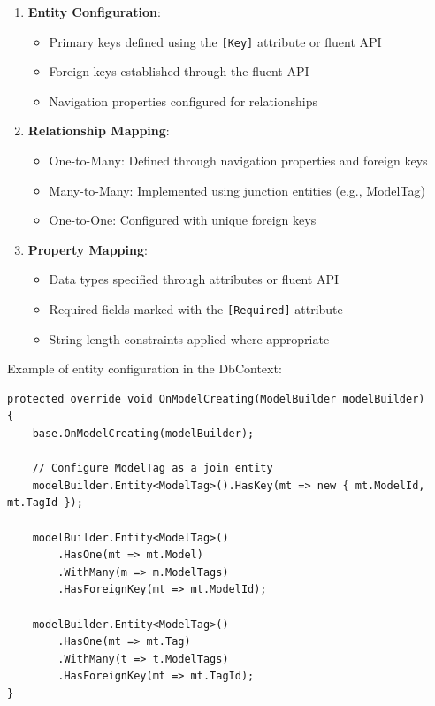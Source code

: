 \begin{enumerate}
   \item \textbf{Entity Configuration}:
   \begin{itemize}
      \item Primary keys defined using the \texttt{[Key]} attribute or fluent API
      \item Foreign keys established through the fluent API
      \item Navigation properties configured for relationships
   \end{itemize}

   \item \textbf{Relationship Mapping}:
   \begin{itemize}
      \item One-to-Many: Defined through navigation properties and foreign keys
      \item Many-to-Many: Implemented using junction entities (e.g., ModelTag)
      \item One-to-One: Configured with unique foreign keys
   \end{itemize}

   \item \textbf{Property Mapping}:
   \begin{itemize}
      \item Data types specified through attributes or fluent API
      \item Required fields marked with the \texttt{[Required]} attribute
      \item String length constraints applied where appropriate
   \end{itemize}
\end{enumerate}

Example of entity configuration in the DbContext:

\begin{verbatim}
protected override void OnModelCreating(ModelBuilder modelBuilder)
{
    base.OnModelCreating(modelBuilder);

    // Configure ModelTag as a join entity
    modelBuilder.Entity<ModelTag>().HasKey(mt => new { mt.ModelId, mt.TagId });

    modelBuilder.Entity<ModelTag>()
        .HasOne(mt => mt.Model)
        .WithMany(m => m.ModelTags)
        .HasForeignKey(mt => mt.ModelId);

    modelBuilder.Entity<ModelTag>()
        .HasOne(mt => mt.Tag)
        .WithMany(t => t.ModelTags)
        .HasForeignKey(mt => mt.TagId);
}
\end{verbatim}

